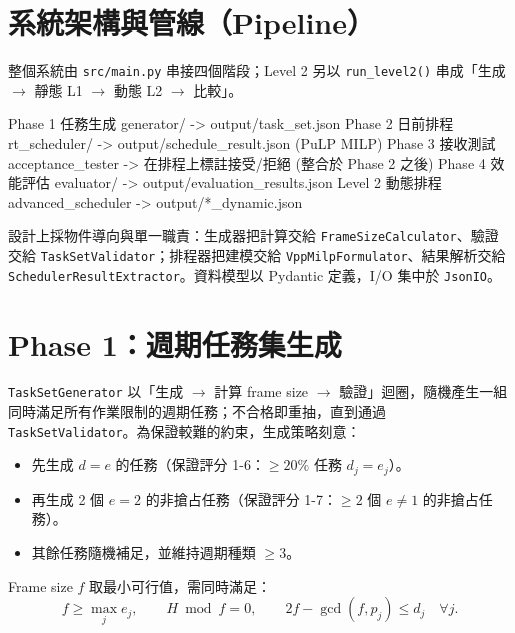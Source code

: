 \documentclass[12pt,a4paper,fontset=none]{ctexart}
\newcommand{\fn}[1]{\texttt{\small #1}}
\begin{document}
\section{系統架構與管線（Pipeline）}
整個系統由 \fn{src/main.py} 串接四個階段；Level 2 另以 \fn{run\_level2()} 串成「生成 $\to$ 靜態 L1 $\to$ 動態 L2 $\to$ 比較」。
\begin{code}
Phase 1  任務生成   generator/          -> output/task_set.json
Phase 2  日前排程   rt_scheduler/       -> output/schedule_result.json  (PuLP MILP)
Phase 3  接收測試   acceptance_tester   -> 在排程上標註接受/拒絕 (整合於 Phase 2 之後)
Phase 4  效能評估   evaluator/          -> output/evaluation_results.json
Level 2  動態排程   advanced_scheduler  -> output/*_dynamic.json
\end{code}
設計上採物件導向與單一職責：生成器把計算交給 \fn{FrameSizeCalculator}、驗證交給 \fn{TaskSetValidator}；排程器把建模交給 \fn{VppMilpFormulator}、結果解析交給 \fn{SchedulerResultExtractor}。資料模型以 Pydantic 定義，I/O 集中於 \fn{JsonIO}。

\section{Phase 1：週期任務集生成}
\fn{TaskSetGenerator} 以「生成 $\to$ 計算 frame size $\to$ 驗證」迴圈，隨機產生一組同時滿足所有作業限制的週期任務；不合格即重抽，直到通過 \fn{TaskSetValidator}。為保證較難的約束，生成策略刻意：
\begin{itemize}
  \item 先生成 $d=e$ 的任務（保證評分 1-6：$\ge 20\%$ 任務 $d_j = e_j$）。
  \item 再生成 2 個 $e=2$ 的非搶占任務（保證評分 1-7：$\ge 2$ 個 $e\neq 1$ 的非搶占任務）。
  \item 其餘任務隨機補足，並維持週期種類 $\ge 3$。
\end{itemize}
Frame size $f$ 取最小可行值，需同時滿足：
\begin{equation}
f \ge \max_j e_j,\qquad H \bmod f = 0,\qquad 2f - \gcd(f, p_j) \le d_j \quad \forall j .
\end{equation}
\end{document}
